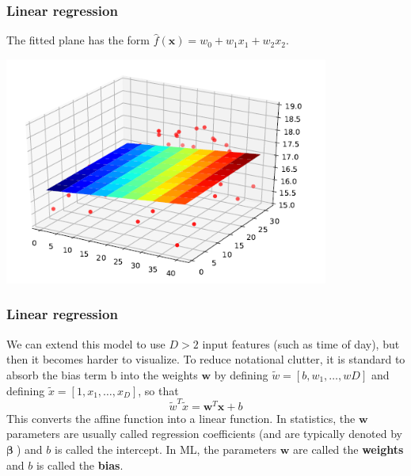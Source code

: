 \documentclass[spanish]{beamer}
\begin{document}
\begin{frame}
\frametitle{Linear regression}
The fitted plane has the form $\hat{f}(\boldsymbol {x}) = w_0 + w_1x_1 + w_2x_2$.

\begin{center}
\includegraphics[width=0.8\textwidth]{im11}
\end{center}


\end{frame}
\begin{frame}
\frametitle{Linear regression}
 We can extend this model to use $D > 2$ input features (such as time of day), but then it becomes
harder to visualize. To reduce notational clutter, it is standard to absorb the bias term b into the weights $\boldsymbol {w}$ by defining
$\tilde{w} = [b,w_1, \ldots,wD]$ and defining $\tilde{x} = [1, x_1, \ldots, x_{D}]$, so that
\begin{equation*}
\tilde{w}^T  \tilde{x} = \boldsymbol{w}^T\boldsymbol{x}+ b
\end{equation*}
This converts the affine function into a linear function.
In statistics, the $ \boldsymbol{w}$ parameters are usually called regression coefficients (and are typically
denoted by $ \boldsymbol{ \beta}$) and $b$ is called the intercept. In ML, the parameters $\boldsymbol{w}$ are called the\textbf{ weights} and $b$
is called the \textbf{bias}.
\end{frame}
\end{document}
